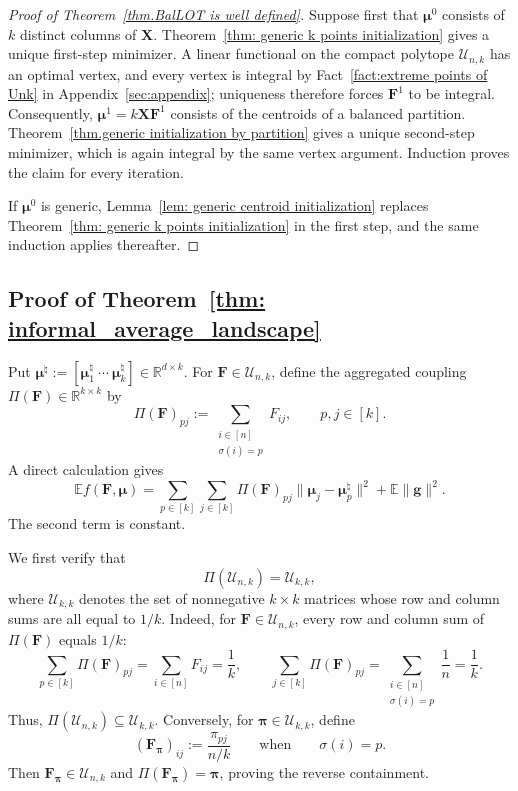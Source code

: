 \documentclass{article}
\theoremstyle{plain}
\theoremstyle{definition}
\newcommand{\1}{\mathbf{1}}
\newcommand{\hmu}{\bm{\mu}^\natural}
\newcommand{\bUnk}{\mathcal{U}_{n,k}}
\newcommand{\bUkk}{\mathcal{U}_{k,k}}
\newcommand{\bmF}{\bm{F}}
\newcommand{\bmu}{\bm{\mu}}
\newcommand{\bmpi}{\bm{\pi}}
\begin{document}
\begin{proof}[Proof of Theorem~\ref{thm.BalLOT is well defined}]
Suppose first that $\bmu^0$ consists of $k$ distinct columns of $\bm{X}$.
Theorem~\ref{thm: generic k points initialization} gives a unique first-step minimizer.
A linear functional on the compact polytope $\bUnk$ has an optimal vertex, and every vertex is integral by Fact~\ref{fact:extreme points of Unk} in Appendix~\ref{sec:appendix}; uniqueness therefore forces $\bmF^1$ to be integral.
Consequently, $\bmu^1=k\bm{X}\bmF^1$ consists of the centroids of a balanced partition.
Theorem~\ref{thm.generic initialization by partition} gives a unique second-step minimizer, which is again integral by the same vertex argument.
Induction proves the claim for every iteration.

If $\bmu^0$ is generic, Lemma~\ref{lem: generic centroid initialization} replaces Theorem~\ref{thm: generic k points initialization} in the first step, and the same induction applies thereafter.
\end{proof}

\subsection{Proof of Theorem~\ref{thm: informal_average_landscape}}
\label{sec: average_landscape}

Put $\hmu:=[\hmu_1\ \cdots\ \hmu_k]\in\mathbb{R}^{d\times k}$.
For $\bmF\in\bUnk$, define the aggregated coupling $\Pi(\bmF)\in\mathbb{R}^{k\times k}$ by
\begin{equation}
\label{eq: definition of Pi}
\Pi(\bmF)_{pj}:=\sum_{\substack{i\in[n]\\\sigma(i)=p}}F_{ij},
\qquad p,j\in[k].
\end{equation}
A direct calculation gives
\begin{equation}
\label{eq: average objective}
\mathbb{E}f(\bmF,\bmu)
=
\sum_{p\in[k]}\sum_{j\in[k]}\Pi(\bmF)_{pj}\|\bmu_j-\hmu_p\|^2
+\mathbb{E}\|\bm{g}\|^2.
\end{equation}
The second term is constant.

We first verify that
\[
\Pi(\bUnk)=\bUkk,
\]
where $\bUkk$ denotes the set of nonnegative $k\times k$ matrices whose row and column sums are all equal to $1/k$.
Indeed, for $\bmF\in\bUnk$, every row and column sum of $\Pi(\bmF)$ equals $1/k$:
\[
\sum_{p\in[k]}\Pi(\bmF)_{pj}
=\sum_{i\in[n]}F_{ij}=\frac{1}{k},
\qquad
\sum_{j\in[k]}\Pi(\bmF)_{pj}
=\sum_{\substack{i\in[n]\\\sigma(i)=p}}\frac{1}{n}=\frac{1}{k}.
\]
Thus, $\Pi(\bUnk)\subseteq\bUkk$.
Conversely, for $\bmpi\in\bUkk$, define
\[
(\bmF_{\bmpi})_{ij}:=\frac{\pi_{pj}}{n/k}
\qquad\text{when}\qquad
\sigma(i)=p.
\]
Then $\bmF_{\bmpi}\in\bUnk$ and $\Pi(\bmF_{\bmpi})=\bmpi$, proving the reverse containment.
\end{document}
